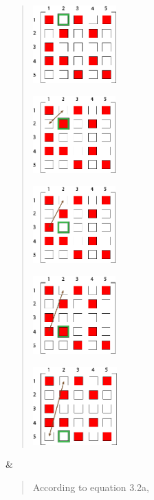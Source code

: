 \begin{minipage}[t]{\linewidth}\raggedright
\begin{quote}
\includegraphics[width=1.25972in,height=1.17786in]{./Scheduler/media/image24.png}

\includegraphics[width=1.25in,height=1.17273in]{./Scheduler/media/image25.png}

\includegraphics[width=1.25in,height=1.17273in]{./Scheduler/media/image26.png}

\includegraphics[width=1.25417in,height=1.17692in]{./Scheduler/media/image27.png}

\includegraphics[width=1.27222in,height=1.19044in]{./Scheduler/media/image28.png}
\end{quote}
\end{minipage} & \begin{minipage}[t]{\linewidth}\raggedright
\begin{quote}
According to equation 3.2a,


\end{quote}
\end{minipage}
